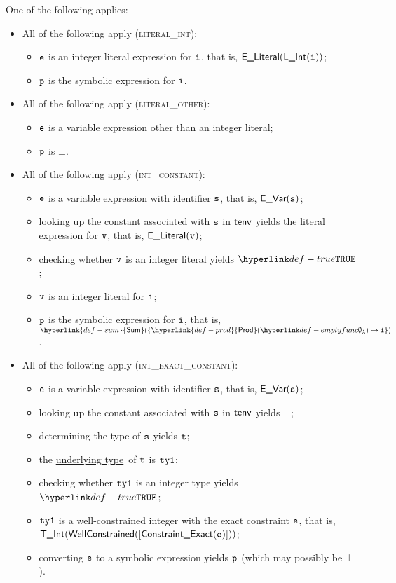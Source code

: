 \documentclass{book}
\newcommand\ProseOrTypeError[0]{\ProseTerminateAs{\TypeErrorConfig}}
\newcommand\Prod[0]{\hyperlink{def-prod}{\textsf{Prod}}}
\newcommand\Sum[0]{\hyperlink{def-sum}{\textsf{Sum}}}
\newcommand\underlyingtype[0]{\hyperlink{def-underlyingtype}{underlying type}}
\begin{document}
One of the following applies:
\begin{itemize}
  \item All of the following apply (\textsc{literal\_int}):
  \begin{itemize}
    \item $\texttt{e}$ is an integer literal expression for $\texttt{i}$, that is, $\textsf{E\_Literal}(\textsf{L\_Int}(\texttt{i}))$;
    \item $\texttt{p}$ is the symbolic expression for $\texttt{i}$.
  \end{itemize}

  \item All of the following apply (\textsc{literal\_other}):
  \begin{itemize}
    \item $\texttt{e}$ is a variable expression other than an integer literal;
    \item $\texttt{p}$ is $\bot$.
  \end{itemize}

  \item All of the following apply (\textsc{int\_constant}):
  \begin{itemize}
    \item $\texttt{e}$ is a variable expression with identifier $\texttt{s}$, that is, $\textsf{E\_Var}(\texttt{s})$;
    \item looking up the constant associated with $\texttt{s}$ in $\textsf{tenv}$ yields the literal expression for $\texttt{v}$, that is, $\textsf{E\_Literal}(\texttt{v})$;
    \item checking whether $\texttt{v}$ is an integer literal yields $\True$\ProseOrTypeError;
    \item $\texttt{v}$ is an integer literal for $\texttt{i}$;
    \item $\texttt{p}$ is the symbolic expression for $\texttt{i}$, that is, $\Sum( \{ \Prod(\emptyfunc)\mapsto \vi \} )$.
  \end{itemize}

  \item All of the following apply (\textsc{int\_exact\_constant}):
  \begin{itemize}
    \item $\texttt{e}$ is a variable expression with identifier $\texttt{s}$, that is, $\textsf{E\_Var}(\texttt{s})$;
    \item looking up the constant associated with $\texttt{s}$ in $\textsf{tenv}$ yields $\bot$;
    \item determining the type of $\texttt{s}$ yields $\texttt{t}$\ProseOrTypeError;
    \item the \underlyingtype\ of $\texttt{t}$ is $\texttt{ty1}$\ProseOrTypeError;
    \item checking whether $\texttt{ty1}$ is an integer type yields $\True$\ProseOrTypeError;
    \item $\texttt{ty1}$ is a well-constrained integer with the exact constraint $\texttt{e}$, that is, \\ $\textsf{T\_Int}(\textsf{WellConstrained}([\textsf{Constraint\_Exact}(\texttt{e})]))$;
    \item converting $\texttt{e}$ to a symbolic expression yields $\texttt{p}$ (which may possibly be $\bot$).
  \end{itemize}


\end{itemize}
\end{document}

